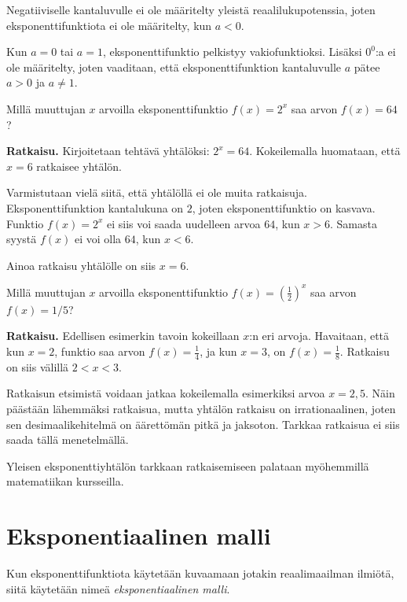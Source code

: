 Negatiiviselle kantaluvulle ei ole määritelty yleistä reaalilukupotenssia, 
joten eksponenttifunktiota ei ole määritelty, kun $a < 0$. 

Kun $a=0$ tai $a=1$, eksponenttifunktio pelkistyy vakiofunktioksi.
Lisäksi $0^0$:a ei ole määritelty, joten vaaditaan, että
eksponenttifunktion kantaluvulle $a$ pätee $a>0$ ja $a \neq 1$.


\begin{esimerkki}
Millä muuttujan $x$ arvoilla eksponenttifunktio $f(x) = 2^x$ saa arvon
$f(x) = 64$?

\textbf{Ratkaisu.}
Kirjoitetaan tehtävä yhtälöksi: $2^x = 64$. Kokeilemalla huomataan,
että $x = 6$ ratkaisee yhtälön.

Varmistutaan vielä siitä, että yhtälöllä ei ole muita ratkaisuja.
Eksponenttifunktion kantalukuna on $2$, joten eksponenttifunktio on
kasvava. Funktio $f(x) = 2^x$ ei siis voi saada uudelleen arvoa $64$,
kun $x > 6$. Samasta syystä $f(x)$ ei voi olla $64$, kun $x < 6$.

Ainoa ratkaisu yhtälölle on siis $x = 6$.
\end{esimerkki}

\begin{esimerkki}
Millä muuttujan $x$ arvoilla eksponenttifunktio
$f(x) = \left( \frac{1}{2} \right)^{x}$ saa arvon
$f(x) = 1/5$?

\textbf{Ratkaisu.}
Edellisen esimerkin tavoin kokeillaan $x$:n eri arvoja. Havaitaan,
että kun $x = 2$, funktio saa arvon $f(x) = \frac{1}{4}$, ja
kun $x = 3$, on $f(x) = \frac{1}{8}$. Ratkaisu on siis välillä
$2 < x < 3$.

Ratkaisun etsimistä voidaan jatkaa kokeilemalla esimerkiksi
arvoa $x = 2,5$. Näin päästään lähemmäksi ratkaisua, mutta
yhtälön ratkaisu on irrationaalinen, joten sen desimaalikehitelmä
on äärettömän pitkä ja jaksoton. Tarkkaa ratkaisua ei siis saada tällä menetelmällä.

Yleisen eksponenttiyhtälön tarkkaan ratkaisemiseen palataan myöhemmillä
matematiikan kursseilla.
\end{esimerkki}


\section{Eksponentiaalinen malli}

Kun eksponenttifunktiota käytetään kuvaamaan jotakin reaalimaailman
ilmiötä, siitä käytetään nimeä \emph{eksponentiaalinen malli}.

